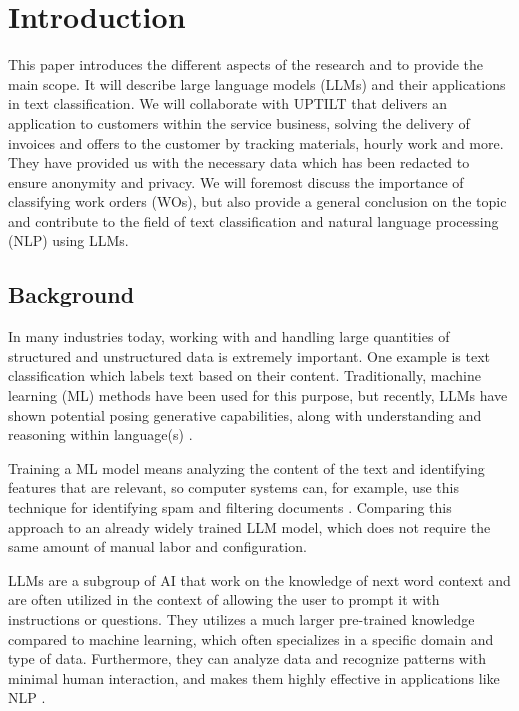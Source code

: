 \section{Introduction}

This paper introduces the different aspects of the research and to provide the
main scope.
It will describe large language models (LLMs) and their applications in text
classification.
We will collaborate with UPTILT that delivers an application to customers within
the service business, solving the delivery of invoices and offers to the
customer by tracking materials, hourly work and more.
They have provided us with the necessary data which has been redacted to ensure
anonymity and privacy.
We will foremost discuss the importance of classifying work orders (WOs), but
also provide a general conclusion on the topic and contribute to the field of
text classification and natural language processing (NLP) using LLMs.

\subsection{Background}

In many industries today, working with and handling large quantities of
structured and unstructured data is extremely important.
One example is text classification which labels text based on their content.
Traditionally, machine learning (ML) methods have been used for this purpose,
but recently, LLMs have shown potential posing generative capabilities, along
with understanding and reasoning within language(s)
\cite{huang2024} \cite{zhang2024}.

Training a ML model means analyzing the content of the text and identifying
features that are relevant, so computer systems can, for example, use this
technique for identifying spam and filtering documents \cite{dalal2011}.
Comparing this approach to an already widely trained LLM model, which does not
require the same amount of manual labor and configuration.

LLMs are a subgroup of AI that work on the knowledge of next word context and
are often utilized in the context of allowing the user to prompt it with
instructions or questions.
They utilizes a much larger pre-trained knowledge compared to machine learning,
which often specializes in a specific domain and type of data.
Furthermore, they can analyze data and recognize patterns with minimal human
interaction, and makes them highly effective in applications like NLP
\cite{andersson2024}.

